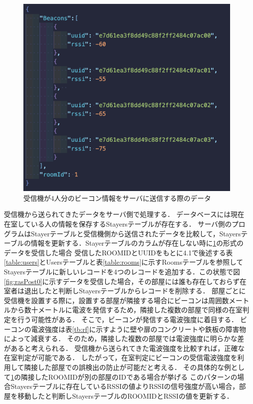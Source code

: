 \begin{figure}[H]
  \begin{center}
    \includegraphics[width=160mm]{image/rasPost4.png}
    \caption{受信機が4人分のビーコン情報をサーバに送信する際のデータ}
    \label{fig:rasPost4}
  \end{center}
\end{figure}

受信機から送られてきたデータをサーバ側で処理する．
データベースには現在在室している人の情報を保存するStayersテーブルが存在する．
サーバ側のプログラムはStayerテーブルと受信機側から送信されたデータを比較して，Stayersテーブルの情報を更新する．Stayerテーブルのカラムが存在しない時に\ref{fig:rasPost4}の形式のデータを受信した場合
受信したROOMIDとUUIDをもとに4.1で後述する表\ref{table:users}とUsersテーブルと表\ref{table:rooms}に示すRoomsテーブルを参照してStayersテーブルに新しいレコードを4つのレコードを追加する．この状態で図\ref{fig:rasPost0}に示すデータを受信した場合，その部屋には誰も存在しておらず在室者は退出したと判断しStayersテーブルからレコードを削除する．
部屋ごとに受信機を設置する際に，設置する部屋が隣接する場合にビーコンは周囲数メートルから数十メートルに電波を発信するため，隣接した複数の部屋で同様の在室判定を行う可能性がある．
そこで，ビーコンが発信する電波強度に着目する．
ビーコンの電波強度は表\ref{tb:rf}に示すように壁や扉のコンクリートや鉄板の障害物によって減衰する\cite{barrier}．
そのため，隣接した複数の部屋では電波強度に明らかな差があると考えられる．
受信機から送られてきた電波強度を比較すれば，正確な在室判定が可能である．
したがって，在室判定にビーコンの受信電波強度を利用して隣接した部屋での誤検出の防止が可能だと考える．
その具体的な例として\ref{fig:rasPost4}の隣接したROOMIDが別の部屋のIDである場合が挙げる
このパターンの場合Stayersテーブルに存在しているRSSIの値よりRSSIの信号強度が高い場合，部屋を移動したと判断しStayersテーブルのROOMIDとRSSIの値を更新する．

